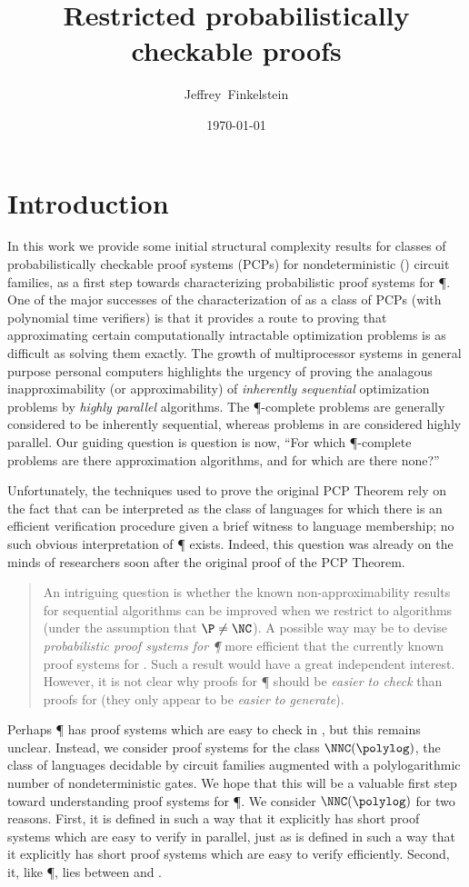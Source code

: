 \documentclass[]{article}
\title{Restricted probabilistically checkable proofs}
\author{Jef{}frey~Finkelstein}
\date{\today}
\begin{document}
\maketitle

\section{Introduction}

In this work we provide some initial structural complexity results for classes of probabilistically checkable proof systems (PCPs) for nondeterministic \NC{} (\NNC) circuit families, as a first step towards characterizing probabilistic proof systems for \P.
One of the major successes of the characterization of \NP{} as a class of PCPs (with polynomial time verifiers) is that it provides a route to proving that approximating certain computationally intractable optimization problems is as difficult as solving them exactly.
The growth of multiprocessor systems in general purpose personal computers highlights the urgency of proving the analagous inapproximability (or approximability) of \emph{inherently sequential} optimization problems by \emph{highly parallel} algorithms.
The \P-complete problems are generally considered to be inherently sequential, whereas problems in \NC{} are considered highly parallel.
Our guiding question is question is now, ``For which \P-complete problems are there \NC{} approximation algorithms, and for which are there none?''

Unfortunately, the techniques used to prove the original PCP Theorem rely on the fact that \NP{} can be interpreted as the class of languages for which there is an efficient verification procedure given a brief witness to language membership; no such obvious interpretation of \P{} exists.
Indeed, this question was already on the minds of researchers soon after the original proof of the PCP Theorem.
\begin{quote}
  An intriguing question is whether the known non-approximability results for sequential algorithms can be improved when we restrict to \NC{} algorithms (under the assumption that $\P \neq \NC$).
  A possible way may be to devise \emph{probabilistic proof systems for \P} more efficient that the currently known proof systems for \NP.
  Such a result would have a great independent interest.
  However, it is not clear why proofs for \P{} should be \emph{easier to check} than proofs for \NP{} (they only appear to be \emph{easier to generate}). \cite{trevisan98}
\end{quote}
Perhaps \P{} has proof systems which are easy to check in \NC, but this remains unclear.
Instead, we consider proof systems for the class $\NNC(\polylog)$, the class of languages decidable by \NC{} circuit families augmented with a polylogarithmic number of nondeterministic gates.
We hope that this will be a valuable first step toward understanding proof systems for \P.
We consider $\NNC(\polylog)$ for two reasons.
First, it is defined in such a way that it explicitly has short proof systems which are easy to verify in parallel, just as \NP{} is defined in such a way that it explicitly has short proof systems which are easy to verify efficiently.
Second, it, like \P, lies between \NC{} and \NP{}.
\end{document}
